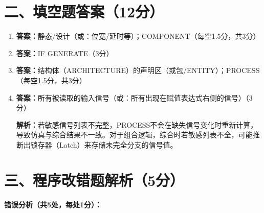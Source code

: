 \section{二、填空题答案（12分）}

\begin{enumerate}[label=\arabic*., leftmargin=*]

\item \textbf{答案：}静态/设计（或：位宽/延时等）；COMPONENT（每空1.5分，共3分）

\item \textbf{答案：}IF GENERATE（3分）

\item \textbf{答案：}结构体（ARCHITECTURE）的声明区（或包/ENTITY）；PROCESS（每空1.5分，共3分）

\item \textbf{答案：}所有被读取的输入信号（或：所有出现在赋值表达式右侧的信号）（3分）

\textbf{解析：}若敏感信号列表不完整，PROCESS不会在缺失信号变化时重新计算，导致仿真与综合结果不一致。对于组合逻辑，综合时若敏感列表不全，可能推断出锁存器（Latch）来存储未完全分支的信号值。

\end{enumerate}

\section{三、程序改错题解析（5分）}

\textbf{错误分析（共5处，每处1分）：}

